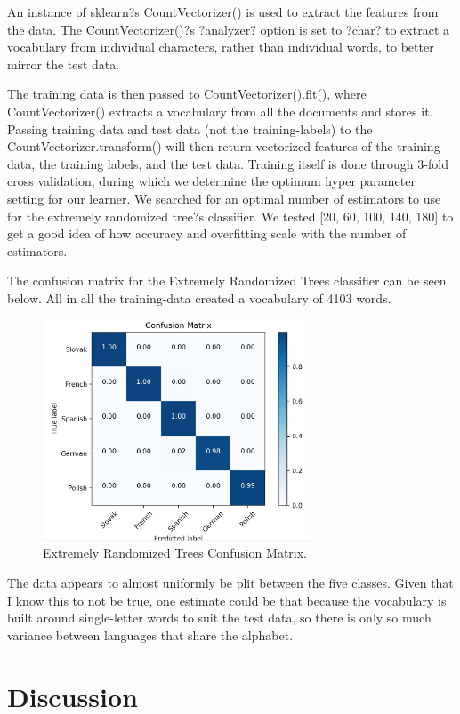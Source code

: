 \documentclass[conference]{IEEEtran}
\begin{document}
An instance of sklearn?s CountVectorizer() is used to extract the features from the data. The CountVectorizer()?s ?analyzer? option is set to ?char? to extract a vocabulary from individual characters, rather than individual words, to better mirror the test data.

The training data is then passed to CountVectorizer().fit(), where CountVectorizer() extracts a vocabulary from all the documents and stores it. Passing training data and test data (not the training-labels) to the CountVectorizer.transform() will then return vectorized features of the training data, the training labels, and the test data.
Training itself is done through 3-fold cross validation, during which we determine the optimum hyper parameter setting for our learner. We searched for an optimal number of estimators to use for the extremely randomized tree?s classifier. We tested [20, 60, 100, 140, 180] to get a good idea of how accuracy and overfitting scale with the number of estimators.

The confusion matrix for the Extremely Randomized Trees classifier can be seen below. All in all the training-data created a vocabulary of 4103 words. 

\begin{figure}[htbp]
\centering
\includegraphics[width=80mm]{confusion_ert.png}
\caption{Extremely Randomized Trees Confusion Matrix.}
\label{confusion_extremely_randomized_trees}
\end{figure}

The data appears to almost uniformly be plit between the five classes. Given that I know this to not be true, one estimate could be that because the vocabulary is built around single-letter words to suit the test data, so there is only so much variance between languages that share the alphabet. 


\section{Discussion}
\end{document}
